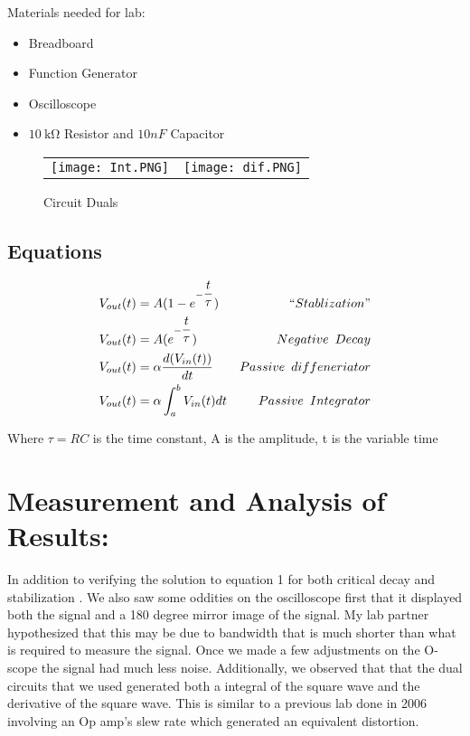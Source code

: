 \documentclass[10pt,a4paper]{article}
\begin{document}
\begin{flushleft}
Materials needed for lab:
\end{flushleft}
\begin{itemize}
\item Breadboard
\item Function Generator 
\item Oscilloscope
\item  $\SI{10}{\kohm}$ Resistor and $10nF$ Capacitor 
\end{itemize}



\begin{figure}[h]
\begin{center}
\begin{tabular}{l l}
\texttt{[image: Int.PNG]}
&
\texttt{[image: dif.PNG]}
\end{tabular}
\end{center}


\caption{ Circuit Duals}
\label{Fig:Race}
\end{figure}


\subsection{Equations}
 
\begin{align}
V_{out}(t) &=A(1-e^{-\dfrac{t}{\tau}}) & ``Stablization"  \\
V_{out}(t) & =A(e^{-\dfrac{t}{\tau}})  & Negative \enspace Decay  \\
V_{out}(t) & = \alpha \dfrac{d(V_{in}(t))}{dt} & Passive\enspace diffeneriator \\
V_{out}(t) &= \alpha \int_{a}^{b} V_{in} (t)dt  & Passive\enspace Integrator
\end{align}


\begin{flushright}
Where $\tau = RC $ is the time constant, A is the amplitude, t is the variable time \

\end{flushright}




\section*{Measurement and Analysis of Results:}
In addition to verifying the solution to equation 1 for both critical decay and stabilization . We also saw some oddities on the oscilloscope first that it displayed both the signal and a 180 degree mirror image of the signal. My lab partner hypothesized that this may be due to bandwidth that is much shorter than what is required to measure the signal. Once we made a few adjustments on the O-scope the signal had much less noise. Additionally, we observed that that the dual circuits that we used generated both a integral of the square wave and the derivative of the square wave.  This is similar to a previous lab done in 2006 involving an Op amp's slew  rate which generated an equivalent distortion.
\end{document}
